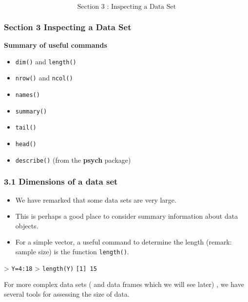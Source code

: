 \documentclass{beamer}
\begin{document}
 	
 	\begin{frame}
 		\Huge
 		\[\mbox{ Section 3 : Inspecting a Data Set } \]
 	\end{frame}
 	\begin{frame}
 		\frametitle{Section 3 Inspecting a Data Set}
 		\large 
 		\textbf{Summary of useful commands}
 		\begin{itemize}
 			\item \texttt{dim()} and \texttt{length()}
 			\item \texttt{nrow()} and \texttt{ncol()}
 			\item \texttt{names()}
 			\item \texttt{summary()}
 			\item \texttt{tail()}
 			\item \texttt{head()}
 			\item \texttt{describe()} (from the \textbf{psych} package)
 		\end{itemize}
 	\end{frame}
 	\begin{frame}
 		
 		\frametitle{3.1 Dimensions of a data set}
 		\begin{itemize}
 			\item We have remarked that some data sets are very large. 
 			\item This is perhaps a good place to consider
 			summary information about data objects. 
 			\item For a simple vector, a useful command to determine
 			the length (remark: sample size) is the function \texttt{length()}.
 		\end{itemize}
 		\begin{framed}
 			> \texttt{Y=4:18}
 			> \texttt{length(Y)}
 			\texttt{[1] 15}
 			
 		\end{framed}
 		For more complex data sets ( and data frames which we will see later) , we have several
 		tools for assessing the size of data.
 	\end{frame}
\end{document}
